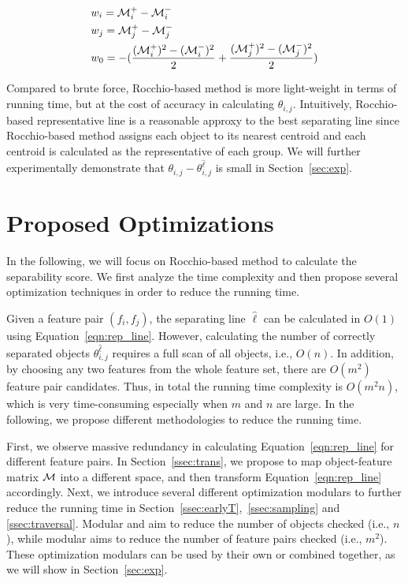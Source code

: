 \begin{equation}\label{eqn:rep_line}
\begin{split}
& w_i = \mm_i^+-\mm_i^- \\
& w_j = \mm_j^+-\mm_j^- \\
& w_0 = -(\frac{(\mm_i^+)^2-(\mm_i^-)^2}{2}+\frac{(\mm_j^+)^2-(\mm_j^-)^2}{2})
\end{split}
\end{equation}


 Compared to brute force, Rocchio-based method is more light-weight in terms of running time, but at the cost of accuracy in calculating $\theta_{i,j}$. Intuitively, Rocchio-based representative line is a reasonable approxy to the best separating line since Rocchio-based method assigns each object to its nearest centroid and each centroid is calculated as the representative of each group. We will further experimentally demonstrate that $\theta_{i,j}-\theta_{i,j}^{\hat{\ell}}$ is small in Section~\ref{sec:exp}.


\section{Proposed Optimizations}\label{sec:opt}
In the following, we will focus on Rocchio-based method to calculate the separability score. We first analyze the time complexity and then propose several optimization techniques in order to reduce the running time. 

 Given a feature pair $(f_i, f_j)$, the separating line $\hat{\ell}$ can be calculated in $O(1)$ using Equation~\ref{eqn:rep_line}. However, calculating the number of correctly separated objects $\theta_{i,j}^{\hat{\ell}}$ requires a full scan of all objects, i.e., $O(n)$. In addition, by choosing any two features from the whole feature set, there are $O(m^2)$ feature pair candidates. Thus, in total the running time complexity is $O(m^2n)$, which is very time-consuming especially when $m$ and $n$ are large. In the following, we propose different methodologies to reduce the running time.

First, we observe massive redundancy in calculating Equation~\ref{eqn:rep_line} for different feature pairs. In Section~\ref{ssec:trans}, we propose to map object-feature matrix $\mm$ into a different space, and then transform Equation~\ref{eqn:rep_line} accordingly. Next, we introduce several different optimization modulars to further reduce the running time in Section~\ref{ssec:earlyT},~\ref{ssec:sampling} and \ref{ssec:traversal}. Modular \earlyT and \sampling aim to reduce the number of objects checked (i.e., $n$), while modular \traversal aims to reduce the number of feature pairs checked (i.e., $m^2$). These optimization modulars can be used by their own or combined together, as we will show in Section~\ref{sec:exp}. 

